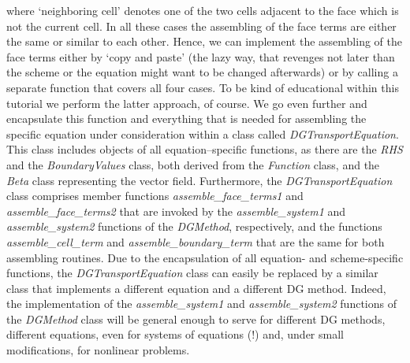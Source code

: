 \documentclass[11pt]{article}
\begin{document}
where `neighboring cell' denotes one of the two cells adjacent to the
face which is not the current cell. In all these cases the assembling
of the face terms are either the same or similar to each other. Hence,
we can implement the assembling of the face terms either by `copy and
paste' (the lazy way, that revenges not later than the scheme or the
equation might want to be changed afterwards) or by calling a separate
function that covers all four cases. To be kind of educational within
this tutorial we perform the latter approach, of course. We go even
further and encapsulate this function and everything that is needed
for assembling the specific equation under consideration within a
class called \emph{DGTransportEquation}. This class includes objects
of all equation--specific functions, as there are the \emph{RHS} and
the \emph{BoundaryValues} class, both derived from the \emph{Function}
class, and the \emph{Beta} class representing the vector field.
Furthermore, the \emph{DGTransportEquation} class comprises member
functions \emph{assemble\_face\_terms1} and
\emph{assemble\_face\_terms2} that are invoked by the
\emph{assemble\_system1} and \emph{assemble\_system2} functions of the
\emph{DGMethod}, respectively, and the functions
\emph{assemble\_cell\_term} and \emph{assemble\_boundary\_term} that
are the same for both assembling routines. Due to the encapsulation of
all equation- and scheme-specific functions, the
\emph{DGTransportEquation} class can easily be replaced by a similar
class that implements a different equation and a different DG method.
Indeed, the implementation of the \emph{assemble\_system1} and
\emph{assemble\_system2} functions of the \emph{DGMethod} class will
be general enough to serve for different DG methods, different
equations, even for systems of equations (!) and, under small
modifications, for nonlinear problems.
\end{document}
